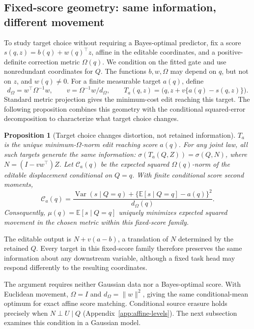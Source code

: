 \documentclass{article}
\theoremstyle{plain}
\newtheorem{proposition}[theorem]{Proposition}
\theoremstyle{definition}
\newcommand{\E}{\mathbb E}
\DeclareMathOperator{\Var}{Var}
\begin{document}
\subsection{Fixed-score geometry: same information, different movement}
To study target choice without requiring a Bayes-optimal predictor, fix a
score $s(q,z)=b(q)+w(q)^\top z$, affine in the editable coordinates, and a
positive-definite correction metric $\Omega(q)$. We condition on the fitted
gate and use nonredundant coordinates for $Q$. The functions $b,w,\Omega$
may depend on $q$, but not on $z$, and $w(q)\ne0$.
For a finite measurable target $a(q)$, define
\begin{equation}
 d_\Omega=w^\top\Omega^{-1}w,\qquad v=\Omega^{-1}w/d_\Omega,\qquad
 T_a(q,z)=\bigl(q,z+v\{a(q)-s(q,z)\}\bigr).
 \label{eq:affine-map}
\end{equation}
Standard metric projection gives the minimum-cost edit reaching this target.
The following proposition combines this geometry with the conditional
squared-error decomposition to characterize what target choice changes.

\begin{proposition}[Target choice changes distortion, not retained information]
\label{prop:parallel-levels}
$T_a$ is the unique minimum-$\Omega$-norm edit reaching score $a(q)$.
For any joint law, all such targets generate the same information:
$\sigma(T_a(Q,Z))=\sigma(Q,N)$, where $N=(I-vw^\top)Z$.
Let $\mathcal C_a(q)$ be the expected squared $\Omega(q)$-norm of the
editable displacement conditional on $Q=q$. With finite conditional score
second moments,
\begin{equation}
 \mathcal C_a(q)
 =\frac{\Var(s\mid Q=q)+\{\E[s\mid Q=q]-a(q)\}^2}{d_\Omega(q)}.
 \label{eq:affine-cost}
\end{equation}
Consequently, $\mu(q)=\E[s\mid Q=q]$ uniquely minimizes expected squared
movement in the chosen metric within this fixed-score family.
\end{proposition}

The editable output is $N+v(a-b)$, a translation of $N$ determined by the
retained $Q$. Every target in this fixed-score family therefore preserves the
same information about any downstream variable, although a fixed task head
may respond differently to the resulting coordinates.

The argument requires neither Gaussian data nor a Bayes-optimal score.
With Euclidean movement, $\Omega=I$ and $d_\Omega=\|w\|^2$, giving the same
conditional-mean optimum for exact affine score matching. Conditional source
erasure holds precisely when $N\perp U\mid Q$
(Appendix~\ref{app:affine-levels}). The next subsection examines this condition
in a Gaussian model.
\end{document}
